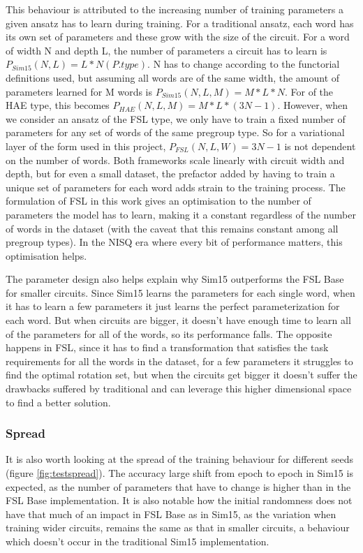 This behaviour is attributed to the increasing number of training parameters a given ansatz has to learn during training. For a traditional ansatz, each word has its own set of parameters and these grow with the size of the circuit. For a word of width N and depth L, the number of parameters a circuit has to learn is $P_{Sim15}(N,L)=L*N(P.type)$. N has to change according to the functorial definitions used, but assuming all words are of the same width, the amount of parameters learned for M words is $P_{Sim15}(N,L,M)=M*L*N$. For \mya of the HAE type, this becomes $P_{HAE}(N,L,M)=M*L*(3N-1)$. However, when we consider an ansatz of the FSL type, we only have to train a fixed number of parameters for any set of words of the same pregroup type. So for a variational layer of the form used in this project, $P_{FSL}(N,L,W)=3N-1$ is not dependent on the number of words. Both frameworks scale linearly with circuit width and depth, but for even a small dataset, the prefactor added by having to train a unique set of parameters for each word adds strain to the training process. The formulation of FSL in this work gives an optimisation to the number of parameters the model has to learn, making it a constant regardless of the number of words in the dataset (with the caveat that this remains constant among all pregroup types). In the NISQ era where every bit of performance matters, this optimisation helps.

The parameter design also helps explain why Sim15 outperforms the FSL Base for smaller circuits. Since Sim15 learns the parameters for each single word, when it has to learn a few parameters it just learns the perfect parameterization for each word. But when circuits are bigger, it doesn't have enough time to learn all of the parameters for all of the words, so its performance falls. The opposite happens in FSL, since it has to find a transformation that satisfies the task requirements for all the words in the dataset, for a few parameters it struggles to find the optimal rotation set, but when the circuits get bigger it doesn't suffer the drawbacks suffered by traditional \mya and can leverage this higher dimensional space to find a better solution. 



\subsubsection{Spread}

It is also worth looking at the spread of the training behaviour for different seeds (figure \ref{fig:testspread}). The accuracy large shift from epoch to epoch in Sim15 is expected, as the number of parameters that have to change is higher than in the FSL Base implementation. It is also notable how the initial randomness does not have that much of an impact in FSL Base as in Sim15, as the variation when training wider circuits, remains the same as that in smaller circuits, a behaviour which doesn't occur in the traditional Sim15 implementation.


